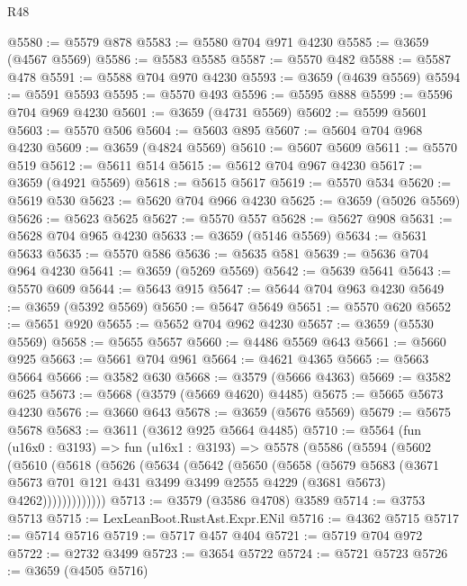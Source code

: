 \begin{lexlean}{R48}
\begin{coremodule}
@5580 := @5579 @878
@5583 := @5580 @704 @971 @4230
@5585 := @3659 (@4567 @5569)
@5586 := @5583 @5585
@5587 := @5570 @482
@5588 := @5587 @478
@5591 := @5588 @704 @970 @4230
@5593 := @3659 (@4639 @5569)
@5594 := @5591 @5593
@5595 := @5570 @493
@5596 := @5595 @888
@5599 := @5596 @704 @969 @4230
@5601 := @3659 (@4731 @5569)
@5602 := @5599 @5601
@5603 := @5570 @506
@5604 := @5603 @895
@5607 := @5604 @704 @968 @4230
@5609 := @3659 (@4824 @5569)
@5610 := @5607 @5609
@5611 := @5570 @519
@5612 := @5611 @514
@5615 := @5612 @704 @967 @4230
@5617 := @3659 (@4921 @5569)
@5618 := @5615 @5617
@5619 := @5570 @534
@5620 := @5619 @530
@5623 := @5620 @704 @966 @4230
@5625 := @3659 (@5026 @5569)
@5626 := @5623 @5625
@5627 := @5570 @557
@5628 := @5627 @908
@5631 := @5628 @704 @965 @4230
@5633 := @3659 (@5146 @5569)
@5634 := @5631 @5633
@5635 := @5570 @586
@5636 := @5635 @581
@5639 := @5636 @704 @964 @4230
@5641 := @3659 (@5269 @5569)
@5642 := @5639 @5641
@5643 := @5570 @609
@5644 := @5643 @915
@5647 := @5644 @704 @963 @4230
@5649 := @3659 (@5392 @5569)
@5650 := @5647 @5649
@5651 := @5570 @620
@5652 := @5651 @920
@5655 := @5652 @704 @962 @4230
@5657 := @3659 (@5530 @5569)
@5658 := @5655 @5657
@5660 := @4486 @5569 @643
@5661 := @5660 @925
@5663 := @5661 @704 @961
@5664 := @4621 @4365
@5665 := @5663 @5664
@5666 := @3582 @630
@5668 := @3579 (@5666 @4363)
@5669 := @3582 @625
@5673 := @5668 (@3579 (@5669 @4620) @4485)
@5675 := @5665 @5673 @4230
@5676 := @3660 @643
@5678 := @3659 (@5676 @5569)
@5679 := @5675 @5678
@5683 := @3611 (@3612 @925 @5664 @4485)
@5710 := @5564
    (fun (u16x0 : @3193) =>
    fun (u16x1 : @3193) =>
    @5578
      (@5586
        (@5594
          (@5602
            (@5610
              (@5618
                (@5626
                  (@5634
                    (@5642
                      (@5650
                        (@5658
                          (@5679
                            @5683
                            (@3671
                              @5673
                              @701
                              @121
                              @431
                              @3499
                              @3499
                              @2555
                              @4229
                              (@3681 @5673)
                              @4262)))))))))))))
@5713 := @3579 (@3586 @4708) @3589
@5714 := @3753 @5713
@5715 := LexLeanBoot.RustAst.Expr.ENil
@5716 := @4362 @5715
@5717 := @5714 @5716
@5719 := @5717 @457 @404
@5721 := @5719 @704 @972
@5722 := @2732 @3499
@5723 := @3654 @5722
@5724 := @5721 @5723
@5726 := @3659 (@4505 @5716)

\end{coremodule}
\end{lexlean}
